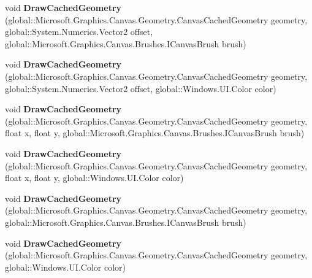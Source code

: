 \begin{DoxyCompactItemize}
void {\bfseries Draw\+Cached\+Geometry} (global\+::\+Microsoft.\+Graphics.\+Canvas.\+Geometry.\+Canvas\+Cached\+Geometry geometry, global\+::\+System.\+Numerics.\+Vector2 offset, global\+::\+Microsoft.\+Graphics.\+Canvas.\+Brushes.\+I\+Canvas\+Brush brush)
\item 
\mbox{\label{class_microsoft_1_1_graphics_1_1_canvas_1_1_canvas_drawing_session_a5450791ed43c8444b41ae10cc67e2267}} 
void {\bfseries Draw\+Cached\+Geometry} (global\+::\+Microsoft.\+Graphics.\+Canvas.\+Geometry.\+Canvas\+Cached\+Geometry geometry, global\+::\+System.\+Numerics.\+Vector2 offset, global\+::\+Windows.\+U\+I.\+Color color)
\item 
\mbox{\label{class_microsoft_1_1_graphics_1_1_canvas_1_1_canvas_drawing_session_a84ab048f076053f05d0006f94fc6cce5}} 
void {\bfseries Draw\+Cached\+Geometry} (global\+::\+Microsoft.\+Graphics.\+Canvas.\+Geometry.\+Canvas\+Cached\+Geometry geometry, float x, float y, global\+::\+Microsoft.\+Graphics.\+Canvas.\+Brushes.\+I\+Canvas\+Brush brush)
\item 
\mbox{\label{class_microsoft_1_1_graphics_1_1_canvas_1_1_canvas_drawing_session_ac63a9ef703b14a5934497fc8036a2a45}} 
void {\bfseries Draw\+Cached\+Geometry} (global\+::\+Microsoft.\+Graphics.\+Canvas.\+Geometry.\+Canvas\+Cached\+Geometry geometry, float x, float y, global\+::\+Windows.\+U\+I.\+Color color)
\item 
\mbox{\label{class_microsoft_1_1_graphics_1_1_canvas_1_1_canvas_drawing_session_a48198d4418b5ee30d6e0d16226f8ce9e}} 
void {\bfseries Draw\+Cached\+Geometry} (global\+::\+Microsoft.\+Graphics.\+Canvas.\+Geometry.\+Canvas\+Cached\+Geometry geometry, global\+::\+Microsoft.\+Graphics.\+Canvas.\+Brushes.\+I\+Canvas\+Brush brush)
\item 
\mbox{\label{class_microsoft_1_1_graphics_1_1_canvas_1_1_canvas_drawing_session_aab2e861f7527e90b52133b04b9c53d5c}} 
void {\bfseries Draw\+Cached\+Geometry} (global\+::\+Microsoft.\+Graphics.\+Canvas.\+Geometry.\+Canvas\+Cached\+Geometry geometry, global\+::\+Windows.\+U\+I.\+Color color)

\end{DoxyCompactItemize}
